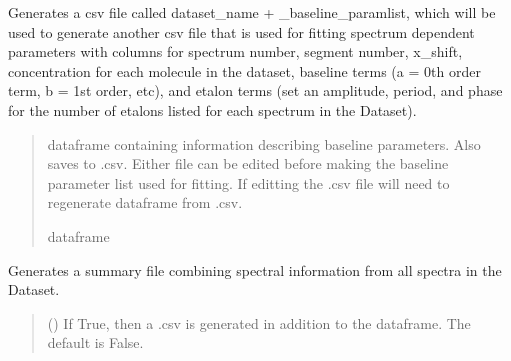 \documentclass[letterpaper,10pt,english]{sphinxmanual}
\begin{document}
\begin{fulllineitems}
\begin{fulllineitems}
\begin{quote}
\begin{description}
\end{description}\end{quote}

\end{fulllineitems}


\begin{fulllineitems}
\label{\detokenize{MATS:MATS.dataset.Dataset.generate_baseline_paramlist}}
\pysigstartsignatures
{}
\pysigstopsignatures
\sphinxAtStartPar
Generates a csv file called dataset\_name + \_baseline\_paramlist, which will be used to generate another csv file that is used for fitting spectrum dependent parameters with columns for
spectrum number, segment number, x\_shift, concentration for each molecule in the dataset, baseline terms (a = 0th order term, b = 1st order, etc), and etalon terms (set an amplitude, period, and phase for the number of etalons listed for each spectrum in the Dataset).
\begin{quote}\begin{description}
\sphinxAtStartPar
{} \textendash{} dataframe containing information describing baseline parameters.  Also saves to .csv.  Either file can be edited before making the baseline parameter list used for fitting.  If editting the .csv file will need to regenerate dataframe from .csv.

\sphinxAtStartPar
dataframe

\end{description}\end{quote}

\end{fulllineitems}


\begin{fulllineitems}
\label{\detokenize{MATS:MATS.dataset.Dataset.generate_summary_file}}
\pysigstartsignatures
{}
\pysigstopsignatures
\sphinxAtStartPar
Generates a summary file combining spectral information from all spectra in the Dataset.
\begin{quote}\begin{description}
\sphinxAtStartPar
{} (\sphinxstyleliteralemphasis{\sphinxupquote{, }}) \textendash{} If True, then a .csv is generated in addition to the dataframe. The default is False.


\end{description}
\end{quote}
\end{fulllineitems}
\end{fulllineitems}
\end{document}
